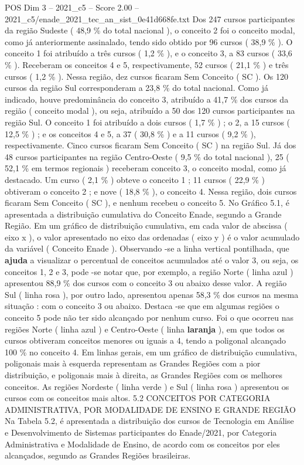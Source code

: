 \begin{textsample}{POS Dim 3 – 2021\_c5 – Score 2.00 – 2021\_c5/enade\_2021\_tec\_an\_sist\_0e41d668fe.txt}
Dos 247 cursos participantes da região Sudeste ( 48,9 \% do total nacional ), o conceito 2 foi o conceito modal, como já anteriormente assinalado, tendo sido obtido por 96 cursos ( 38,9 \% ).
O conceito 1 foi atribuído a três cursos ( 1,2 \% ), e o conceito 3, a 83 cursos ( 33,6 \% ).
Receberam os conceitos 4 e 5, respectivamente, 52 cursos ( 21,1 \% ) e três cursos ( 1,2 \% ).
Nessa região, dez cursos ficaram Sem Conceito ( SC ).
Os 120 cursos da região Sul corresponderam a 23,8 \% do total nacional.
Como já indicado, houve predominância do conceito 3, atribuído a 41,7 \% dos cursos da região ( conceito modal ), ou seja, atribuído a 50 dos 120 cursos participantes na região Sul.
O conceito 1 foi atribuído a dois cursos ( 1,7 \% ) ; o 2, a 15 cursos ( 12,5 \% ) ; e os conceitos 4 e 5, a 37 ( 30,8 \% ) e a 11 cursos ( 9,2 \% ), respectivamente.
Cinco cursos ficaram Sem Conceito ( SC ) na região Sul.
Já dos 48 cursos participantes na região Centro-Oeste ( 9,5 \% do total nacional ), 25 ( 52,1 \% em termos regionais ) receberam conceito 3, o conceito modal, como já destacado.
Um curso ( 2,1 \% ) obteve o conceito 1 ; 11 cursos ( 22,9 \% ) obtiveram o conceito 2 ; e nove ( 18,8 \% ), o conceito 4.
Nessa região, dois cursos ficaram Sem Conceito ( SC ), e nenhum recebeu o conceito 5.
No Gráfico 5.1, é apresentada a distribuição cumulativa do Conceito Enade, segundo a Grande Região.
Em um gráfico de distribuição cumulativa, em cada valor de abscissa ( eixo x ), o valor apresentado no eixo das ordenadas ( eixo y ) é o valor acumulado da variável ( Conceito Enade ).
Observando -se a linha vertical pontilhada, que \textbf{ajuda} a visualizar o percentual de conceitos acumulados até o valor 3, ou seja, os conceitos 1, 2 e 3, pode -se notar que, por exemplo, a região Norte ( linha azul ) apresentou 88,9 \% dos cursos com o conceito 3 ou abaixo desse valor.
A região Sul ( linha rosa ), por outro lado, apresentou apenas 58,3 \% dos cursos na mesma situação : com o conceito 3 ou abaixo.
Destaca -se que em algumas regiões o conceito 5 pode não ter sido alcançado por nenhum curso.
Foi o que ocorreu nas regiões Norte ( linha azul ) e Centro-Oeste ( linha \textbf{laranja} ), em que todos os cursos obtiveram conceitos menores ou iguais a 4, tendo a poligonal alcançado 100 \% no conceito 4.
Em linhas gerais, em um gráfico de distribuição cumulativa, poligonais mais à esquerda representam as Grandes Regiões com a pior distribuição, e poligonais mais à direita, as Grandes Regiões com os melhores conceitos.
As regiões Nordeste ( linha verde ) e Sul ( linha rosa ) apresentou os cursos com os conceitos mais altos. 5.2 CONCEITOS POR CATEGORIA ADMINISTRATIVA, POR MODALIDADE DE ENSINO E GRANDE REGIÃO Na Tabela 5.2, é apresentada a distribuição dos cursos de Tecnologia em Análise e Desenvolvimento de Sistemas participantes do Enade/2021, por Categoria Administrativa e Modalidade de Ensino, de acordo com os conceitos por eles alcançados, segundo as Grandes Regiões brasileiras.

\end{textsample}
